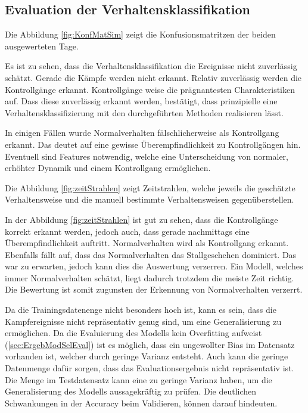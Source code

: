\subsection{Evaluation der Verhaltensklassifikation}
Die Abbildung \ref{fig:KonfMatSim} zeigt die Konfusionsmatritzen der beiden ausgewerteten Tage. 


Es ist zu sehen, dass die Verhaltensklassifikation die Ereignisse nicht zuverlässig schätzt. Gerade die Kämpfe werden nicht erkannt. Relativ zuverlässig werden die Kontrollgänge erkannt. Kontrollgänge weise die prägnantesten Charakteristiken auf. Dass diese zuverlässig erkannt werden, bestätigt, dass prinzipielle eine Verhaltensklassifizierung mit den durchgeführten Methoden realisieren lässt. \par

In einigen Fällen wurde Normalverhalten fälschlicherweise als Kontrollgang erkannt. Das deutet auf eine gewisse Überempfindlichkeit zu Kontrollgängen hin. Eventuell sind Features notwendig, welche eine Unterscheidung von normaler, erhöhter Dynamik und einem Kontrollgang ermöglichen. \par

Die Abbildung \ref{fig:zeitStrahlen} zeigt Zeitstrahlen, welche jeweils die geschätzte Verhaltensweise und die manuell bestimmte Verhaltensweisen gegenüberstellen.  


In der Abbildung \ref{fig:zeitStrahlen} ist gut zu sehen, dass die Kontrollgänge korrekt erkannt werden, jedoch auch, dass gerade nachmittags eine Überempfindlichkeit auftritt. Normalverhalten wird als Kontrollgang erkannt. Ebenfalls fällt auf, dass das Normalverhalten das Stallgeschehen dominiert. Das war zu erwarten, jedoch kann dies die Auswertung verzerren. Ein Modell, welches immer Normalverhalten schätzt, liegt dadurch trotzdem die meiste Zeit richtig. Die Bewertung ist somit zugunsten der Erkennung von Normalverhalten verzerrt. \par

Da die Trainingsdatenenge nicht besonders hoch ist, kann es sein, dass die Kampfereignisse nicht repräsentativ genug sind, um eine Generalisierung zu ermöglichen. Da die Evaluierung des Modells kein Overfitting aufweist (\ref{sec:ErgebModSelEval}) ist es möglich, dass ein ungewollter Bias im Datensatz vorhanden ist, welcher durch geringe Varianz entsteht. Auch kann die geringe Datenmenge dafür sorgen, dass das Evaluationsergebnis nicht repräsentativ ist. Die Menge im Testdatensatz kann eine zu geringe Varianz haben, um die Generalisierung des Modells aussagekräftig zu prüfen. Die deutlichen Schwankungen in der Accuracy beim Validieren, können darauf hindeuten.\par

